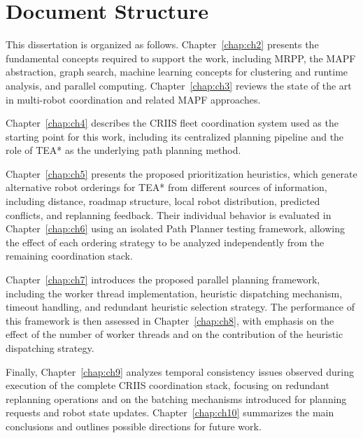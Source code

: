 \section{Document Structure}
\label{sec:document_structure}
\hspace{\parindent}
This dissertation is organized as follows. Chapter~\ref{chap:ch2} presents the fundamental
concepts required to support the work, including MRPP, the MAPF abstraction, graph search,
machine learning concepts for clustering and runtime analysis, and parallel computing.
Chapter~\ref{chap:ch3} reviews the state of the art in multi-robot coordination and related MAPF
approaches.

Chapter~\ref{chap:ch4} describes the CRIIS fleet coordination system used as the starting point for
this work, including its centralized planning pipeline and the role of TEA* as the underlying path
planning method.

Chapter~\ref{chap:ch5} presents the proposed prioritization heuristics, which generate alternative
robot orderings for TEA* from different sources of information, including distance, roadmap
structure, local robot distribution, predicted conflicts, and replanning feedback. Their individual
behavior is evaluated in Chapter~\ref{chap:ch6} using an isolated Path Planner testing framework,
allowing the effect of each ordering strategy to be analyzed independently from the remaining
coordination stack.

Chapter~\ref{chap:ch7} introduces the proposed parallel planning framework, including the worker
thread implementation, heuristic dispatching mechanism, timeout handling, and redundant heuristic
selection strategy. The performance of this framework is then assessed in Chapter~\ref{chap:ch8},
with emphasis on the effect of the number of worker threads and on the contribution of the
heuristic dispatching strategy.

Finally, Chapter~\ref{chap:ch9} analyzes temporal consistency issues observed during execution of
the complete CRIIS coordination stack, focusing on redundant replanning operations and on the
batching mechanisms introduced for planning requests and robot state updates.
Chapter~\ref{chap:ch10} summarizes the main conclusions and outlines possible directions for
future work.
